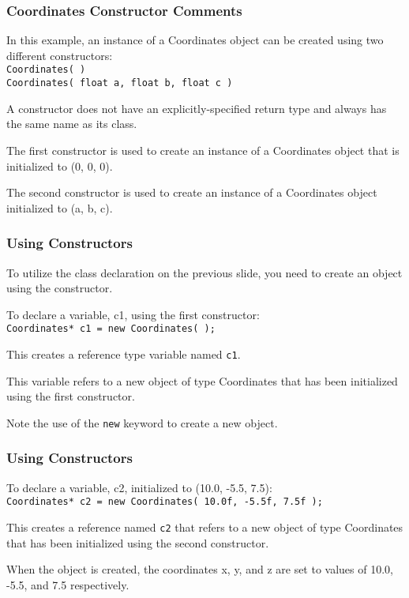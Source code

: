 \begin{frame}
\frametitle{Coordinates Constructor Comments}

In this example, an instance of a Coordinates object can be created using two different constructors:\\
\quad \texttt{Coordinates( )}\\
\quad \texttt{Coordinates( float a, float b, float c )}

A constructor does not have an explicitly-specified return type and always has the same name as its class.

The first constructor is used to create an instance of a Coordinates object that is initialized to (0, 0, 0).

The second constructor is used to create an instance of a Coordinates object initialized to (a, b, c).

\end{frame}

\begin{frame}
\frametitle{Using Constructors}

To utilize the class declaration on the previous slide, you need to create an object using the constructor.

To declare a variable, c1, using the first constructor:\\
\quad \texttt{Coordinates* c1 = new Coordinates( );}

This creates a reference type variable named \texttt{c1}.

This variable refers to a new object of type Coordinates that has been initialized using the first constructor.

Note the use of the \texttt{new} keyword to create a new object.

\end{frame}

\begin{frame}
\frametitle{Using Constructors}
To declare a variable, c2, initialized to (10.0, -5.5, 7.5):\\
\texttt{Coordinates* c2 = new Coordinates( 10.0f, -5.5f, 7.5f );}

This creates a reference named \texttt{c2} that refers to a new object of type Coordinates that has been initialized using the second constructor.

When the object is created, the coordinates x, y, and z are set to values of 10.0, -5.5, and 7.5 respectively.

\end{frame}

